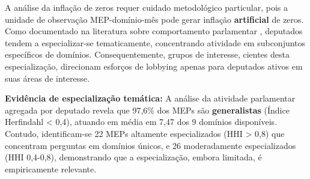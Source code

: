 



A análise da inflação de zeros requer cuidado metodológico particular, pois a unidade de observação MEP-domínio-mês pode gerar inflação \textbf{artificial} de zeros. Como documentado na literatura sobre comportamento parlamentar \cite{example}, deputados tendem a especializar-se tematicamente, concentrando atividade em subconjuntos específicos de domínios. Consequentemente, grupos de interesse, cientes desta especialização, direcionam esforços de lobbying apenas para deputados ativos em suas áreas de interesse.

\textbf{Evidência de especialização temática:} A análise da atividade parlamentar agregada por deputado revela que 97,6\% dos MEPs são \textbf{generalistas} (Índice Herfindahl < 0,4), atuando em média em 7,47 dos 9 domínios disponíveis. Contudo, identificam-se 22 MEPs altamente especializados (HHI > 0,8) que concentram perguntas em domínios únicos, e 26 moderadamente especializados (HHI 0,4-0,8), demonstrando que a especialização, embora limitada, é empiricamente relevante.


